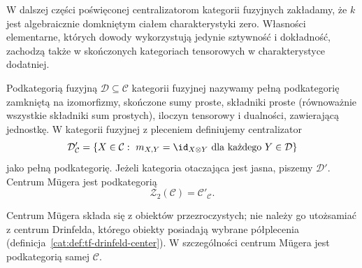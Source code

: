 W dalszej części poświęconej centralizatorom kategorii fuzyjnych zakładamy, że $k$ jest algebraicznie domkniętym ciałem charakterystyki zero. Własności elementarne, których dowody wykorzystują jedynie sztywność i dokładność, zachodzą także w skończonych kategoriach tensorowych w charakterystyce dodatniej.

\begin{definicja}\label{cat:def:tf-muger-centralizer}
Podkategorią fuzyjną $\mathcal D\subseteq\mathcal C$ kategorii fuzyjnej nazywamy pełną podkategorię zamkniętą na izomorfizmy, skończone sumy proste, składniki proste (równoważnie wszystkie składniki sum prostych), iloczyn tensorowy i dualności, zawierającą jednostkę. W kategorii fuzyjnej z pleceniem definiujemy centralizator
\[
 \mathcal D'_{\mathcal C}
 =\{X\in\mathcal C:\ m_{X,Y}=\id_{X\otimes Y}\ \text{dla każdego }Y\in\mathcal D\}
\]
jako pełną podkategorię. Jeżeli kategoria otaczająca jest jasna, piszemy $\mathcal D'$. Centrum Mügera jest podkategorią
\[
 \mathcal Z_2(\mathcal C)=\mathcal C'_{\mathcal C}.
\]
\end{definicja}

Centrum Mügera składa się z obiektów przezroczystych; nie należy go utożsamiać z centrum Drinfelda, którego obiekty posiadają wybrane półplecenia (definicja~\ref{cat:def:tf-drinfeld-center}). W szczególności centrum Mügera jest podkategorią samej $\mathcal C$.

